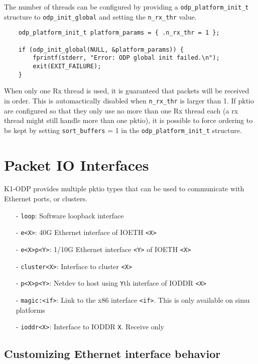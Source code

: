 \documentclass{trkalray}
\begin{document}
The number of threads can be configured by providing a
\texttt{odp\_platform\_init\_t} structure to
\texttt{odp\_init\_global} and setting the \texttt{n\_rx\_thr} value.

\begin{lstlisting}
	odp_platform_init_t platform_params = { .n_rx_thr = 1 };

	if (odp_init_global(NULL, &platform_params)) {
		fprintf(stderr, "Error: ODP global init failed.\n");
		exit(EXIT_FAILURE);
	}
\end{lstlisting}

When only one Rx thread is used, it is guaranteed that packets will be
received in order. This is automactically disabled when \texttt{n\_rx\_thr} is
larger than 1. If pktio are configured so that they only use no more
than one Rx thread each (a rx thread might still handle more than one
pktio), it is possible to force ordering to be kept by setting
\texttt{sort\_buffers} = 1 in the \texttt{odp\_platform\_init\_t} structure.


\newpage
\section{Packet IO Interfaces}

K1-ODP provides multiple pktio types that can be used to communicate
with Ethernet ports, or clusters.

\begin{itemize}
\item[-]{\texttt{loop}: Software loopback interface}
\item[-]{\texttt{e<X>}: 40G Ethernet interface of IOETH \texttt{<X>}}
\item[-]{\texttt{e<X>p<Y>}: 1/10G Ethernet interface \texttt{<Y>} of
  IOETH \texttt{<X>}}
\item[-]{\texttt{cluster<X>}: Interface to cluster \texttt{<X>}}
\item[-]{\texttt{p<X>p<Y>}: Netdev to host using \texttt{Y}th
  interface of IODDR \texttt{<X>}}
\item[-]{\texttt{magic:<if>}: Link to the x86 interface
  \texttt{<if>}. This is only available on simu platforms}
\item[-]{\texttt{ioddr<X>}: Interface to IODDR \texttt{X}. Receive only}
\end{itemize}

\subsection{Customizing Ethernet interface behavior}
\end{document}
